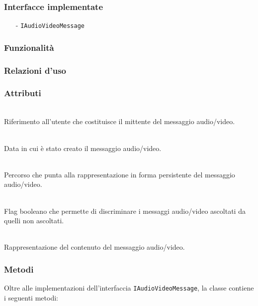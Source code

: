 \subsubsection*{Interfacce implementate}
\begin{itemize}[noitemsep,nolistsep]
  \item[-]\texttt{IAudioVideoMessage}
\end{itemize}

\subsubsection*{Funzionalità}

\subsubsection*{Relazioni d'uso}

\subsubsection*{Attributi}
\begin{description}
  \item{}\\
Riferimento all'utente che costituisce il mittente del messaggio audio/video.
  \item{}\\
Data in cui è stato creato il messaggio audio/video.
  \item{}\\
Percorso che punta alla rappresentazione in forma persistente del messaggio audio/video.
  \item{}\\
Flag booleano che permette di discriminare i messaggi audio/video ascoltati da quelli non ascoltati.
  \item{}\\
Rappresentazione del contenuto del messaggio audio/video.
\end{description}

\subsubsection*{Metodi}
Oltre alle implementazioni dell'interfaccia \texttt{IAudioVideoMessage}, la classe contiene i seguenti metodi:
\begin{description}
  \item{}\\
\end{description}

